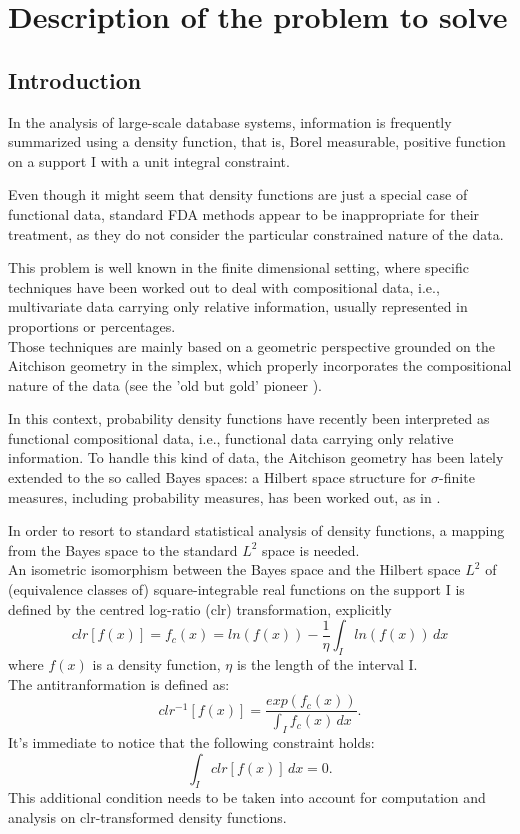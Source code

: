 \chapter{Description of the problem to solve}
\newtheorem*{definition}{Definition}
\label{problem}

\noindent 
\section{Introduction}
In the analysis of large-scale database systems, information is frequently summarized using a density function, that is, Borel measurable, positive function on a support $\text{I}$ with a unit integral constraint. 

Even though it might seem that density functions are just a special case of functional data, standard FDA methods appear to be inappropriate for their treatment, as they do not consider the particular constrained nature of the data.

This problem is well known in the finite dimensional setting, where specific techniques have been worked out to deal with compositional data, i.e., multivariate data carrying only relative information, usually represented in proportions or percentages. \\
Those techniques are mainly based on a geometric perspective grounded on the Aitchison geometry in the simplex, which properly incorporates the compositional nature of the data (see the 'old but gold' pioneer \citep{aitchinson:bayes}). 

In this context, probability density functions have recently been interpreted as functional compositional data, i.e., functional data carrying only relative information.
To handle this kind of data, the Aitchison geometry has been lately extended to the so called Bayes spaces: a Hilbert space structure for $\sigma$-finite measures, including probability measures, has been worked out, as in \citep{vdboogaart:bayes}.

In order to resort to standard statistical analysis of density functions, a mapping from the Bayes space to the standard $\textit{L}^2$ space is needed. \\
An isometric isomorphism between the Bayes space and the Hilbert space $\textit{L}^2$ of (equivalence classes of) square-integrable real functions on the support $\text{I}$ is defined by the centred log-ratio (clr) transformation, explicitly 
\[	clr[f(x)] = f_c(x) = ln(f(x)) - \frac{1}{\eta}\int_{I} ln(f(x))\, dx 	\]
where $f(x)$ is a density function, $\eta$ is the length of the interval I. \\
The antitranformation is defined as: 
\[  clr^{-1}[f(x)]= \frac{exp(f_c(x))}{\int_{I} f_c(x)\, dx}. 	\]
It's immediate to notice that the following constraint holds:
\[	\int_{I} clr[f(x)]\, dx = 0. 			\]
This additional condition needs to be taken into account for computation and analysis on clr-transformed density functions.

